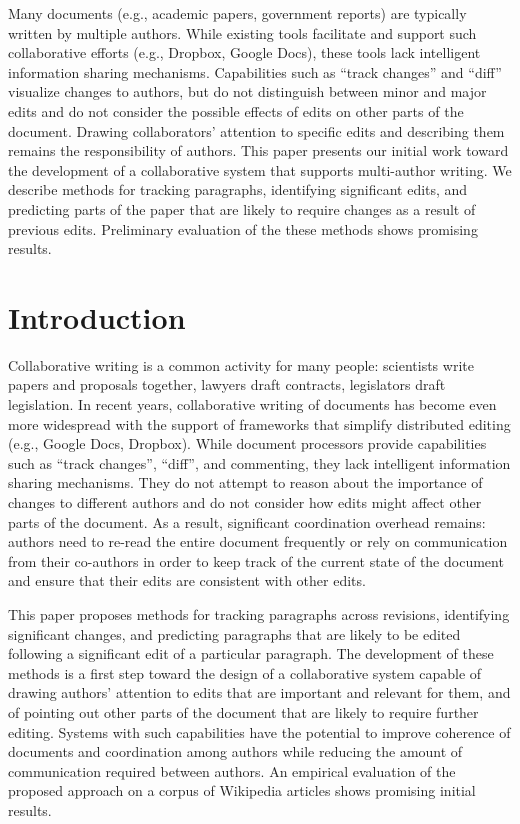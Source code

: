 Many documents (e.g., academic papers, government reports) are typically
written by multiple authors. While existing tools facilitate and support
such collaborative efforts (e.g., Dropbox, Google Docs), these tools
lack intelligent information sharing mechanisms. Capabilities such as
``track changes'' and ``diff'' visualize changes to authors, but do not
distinguish between minor and major edits and do not consider the
possible effects of edits on other parts of the document. Drawing
collaborators' attention to specific edits and describing them remains
the responsibility of authors. This paper presents our initial work
toward the development of a collaborative system that supports
multi-author writing. We describe methods for tracking paragraphs,
identifying significant edits, and predicting parts of the paper that
are likely to require changes as a result of previous edits. Preliminary
evaluation of the these methods shows promising results.

\section{Introduction}\label{introduction}

Collaborative writing is a common activity for many people: scientists
write papers and proposals together, lawyers draft contracts,
legislators draft legislation. In recent years, collaborative writing of
documents has become even more widespread with the support of frameworks
that simplify distributed editing (e.g., Google Docs, Dropbox). While
document processors provide capabilities such as ``track changes'',
``diff'', and commenting, they lack intelligent information sharing
mechanisms. They do not attempt to reason about the importance of
changes to different authors and do not consider how edits might affect
other parts of the document. As a result, significant coordination
overhead remains: authors need to re-read the entire document frequently
or rely on communication from their co-authors in order to keep track of
the current state of the document and ensure that their edits are
consistent with other edits.

This paper proposes methods for tracking paragraphs across revisions,
identifying significant changes, and predicting paragraphs that are
likely to be edited following a significant edit of a particular
paragraph. The development of these methods is a first step toward the
design of a collaborative system capable of drawing authors' attention
to edits that are important and relevant for them, and of pointing out
other parts of the document that are likely to require further editing.
Systems with such capabilities have the potential to improve coherence
of documents and coordination among authors while reducing the amount of
communication required between authors. An empirical evaluation of the
proposed approach on a corpus of Wikipedia articles shows promising
initial results.

